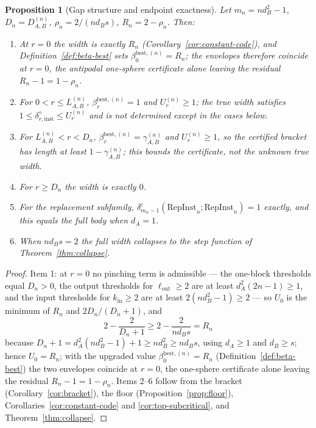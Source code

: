 \documentclass[11pt,a4paper]{article}
\newtheorem{proposition}[theorem]{Proposition}
\newcommand{\RepInst}{\mathrm{RepInst}}
\begin{document}
\begin{proposition}[Gap structure and endpoint exactness]
\label{prop:gap}
Let $m_n=nd_B^2-1$, $D_n=D_{A,B}^{(n)}$, $\rho_n=2/(nd_Bs)$, $R_n=2-\rho_n$. Then:
\begin{enumerate}[leftmargin=*,itemsep=2pt]
\item At $r=0$ the width is exactly $R_n$ (Corollary~\ref{cor:constant-code}), and Definition~\ref{def:beta-best} sets $\beta_0^{\mathrm{best},(n)}=R_n$; the envelopes therefore coincide at $r=0$, the antipodal one-sphere certificate alone leaving the residual $R_n-1=1-\rho_n$.
\item For $0<r\le L_{A,B}^{(n)}$, $\beta_r^{\mathrm{best},(n)}=1$ and $U_r^{(n)}\ge1$; the true width satisfies $1\le\delta_{r,\mathrm{inst}}^{\diamond}\le U_r^{(n)}$ and is not determined except in the cases below.
\item For $L_{A,B}^{(n)}<r<D_n$, $\beta_r^{\mathrm{best},(n)}=\gamma_{A,B}^{(n)}$ and $U_r^{(n)}\ge1$, so the \emph{certified} bracket has length at least $1-\gamma_{A,B}^{(n)}$; this bounds the certificate, not the unknown true width.
\item For $r\ge D_n$ the width is exactly $0$.
\item For the replacement subfamily, $\delta_{m_n-1}^{\mathrm c}(\RepInst_n;\RepInst_n)=1$ exactly, and this equals the full body when $d_A=1$.
\item When $nd_Bs=2$ the full width collapses to the step function of Theorem~\ref{thm:collapse}.
\end{enumerate}
\end{proposition}

\begin{proof}
Item 1: at $r=0$ no pinching term is admissible --- the one-block thresholds equal $D_n>0$, the output thresholds for $\ell_{\mathrm{out}}\ge2$ are at least $d_A^2(2n-1)\ge1$, and the input thresholds for $k_{\mathrm{in}}\ge2$ are at least $2(nd_B^2-1)\ge2$ --- so $U_0$ is the minimum of $R_n$ and $2D_n/(D_n+1)$, and
\[
2-\frac{2}{D_n+1}\ge 2-\frac{2}{nd_Bs}=R_n
\]
because $D_n+1=d_A^2(nd_B^2-1)+1\ge nd_B^2\ge nd_Bs$, using $d_A\ge1$ and $d_B\ge s$; hence $U_0=R_n$; with the upgraded value $\beta_0^{\mathrm{best},(n)}=R_n$ (Definition~\ref{def:beta-best}) the two envelopes coincide at $r=0$, the one-sphere certificate alone leaving the residual $R_n-1=1-\rho_n$. Items 2--6 follow from the bracket (Corollary~\ref{cor:bracket}), the floor (Proposition~\ref{prop:floor}), Corollaries~\ref{cor:constant-code} and \ref{cor:top-subcritical}, and Theorem~\ref{thm:collapse}.
\end{proof}
\end{document}

